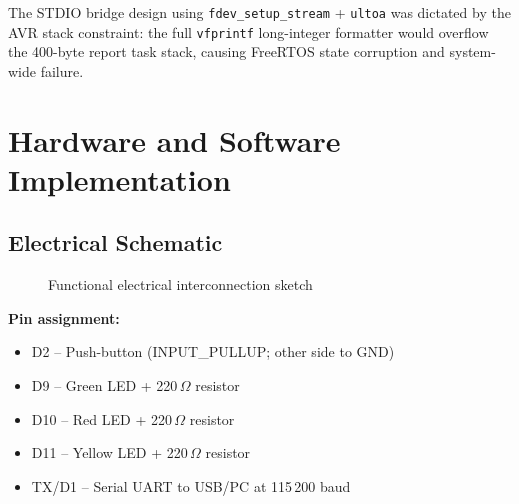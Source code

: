 \documentclass[12pt]{article}
\begin{document}
The STDIO bridge design using \texttt{fdev\_setup\_stream} + \texttt{ultoa} was dictated by the AVR stack constraint: the full \texttt{vfprintf} long-integer formatter would overflow the 400-byte report task stack, causing FreeRTOS state corruption and system-wide failure.

\section{Hardware and Software Implementation}

\subsection{Electrical Schematic}

\begin{figure}[H!]
\centering
{}
\caption{Functional electrical interconnection sketch}
\label{fig:electrical-func}
\end{figure}

\textbf{Pin assignment:}
\begin{itemize}
    \item D2 -- Push-button (INPUT\_PULLUP; other side to GND)
    \item D9 -- Green LED + 220\,$\Omega$ resistor
    \item D10 -- Red LED + 220\,$\Omega$ resistor
    \item D11 -- Yellow LED + 220\,$\Omega$ resistor
    \item TX/D1 -- Serial UART to USB/PC at 115\,200 baud
\end{itemize}
\end{document}
